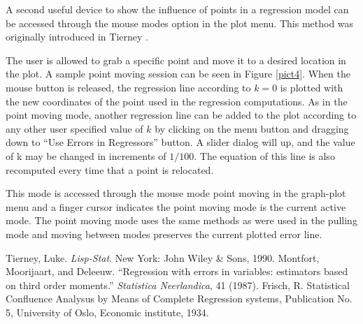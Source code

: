 \documentclass[11pt]{report}
\begin{document}
A second useful device to show the influence of points in a regression
model can be accessed through the mouse modes option in the plot menu.
This method was originally introduced in Tierney \cite{Tierney}.

The user is allowed to grab a specific point and move it to a desired location
in the plot.  A sample point moving session can be seen in Figure \ref{pict4}.
When the mouse button is released, the regression line according to $k=0$ is
plotted with the new coordinates of the point used in the regression 
computations.  As in the point moving mode, another regression line can be 
added to the plot according to 
any other user specified value of $k$ by clicking on the menu button
and dragging down to ``Use Errors in Regressors'' button.  A slider dialog 
will up, and the value of k may be changed in increments 
of $1/100$. The equation of this line is also recomputed 
every time that a point is relocated.
  
  This mode is accessed through the mouse mode point moving in the graph-plot
menu and a finger cursor indicates the point moving mode is the current active
mode.  The point moving
mode uses the same methods as were used in the pulling mode and moving
between modes preserves the current plotted error line.
 
\begin{thebibliography}{75}
 Tierney, Luke. {\it Lisp-Stat}.  New York: John Wiley 
\& Sons, 1990.
 Montfort, Moorijaart, and Deleeuw. ``Regression with
errors in variables: estimators based on third order moments.''  
{\it Statistica Neerlandica}, 41 (1987).
 Frisch, R.  Statistical Confluence Analysus by Means of
Complete Regression systems, Publication No. 5, University of Oslo, Economic
institute, 1934.
\end{thebibliography}
\end{document}
